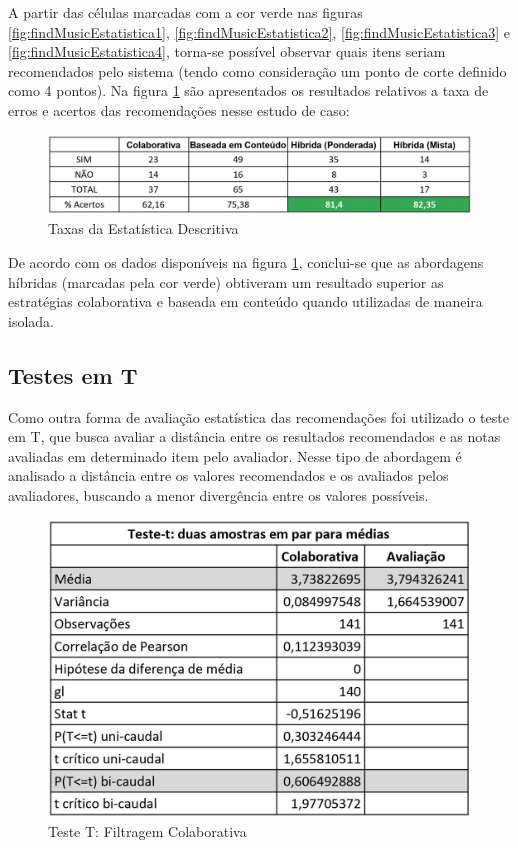 A partir das células marcadas com a cor verde nas figuras \ref{fig:findMusicEstatistica1}, \ref{fig:findMusicEstatistica2}, \ref{fig:findMusicEstatistica3} e \ref{fig:findMusicEstatistica4}, torna-se possível observar quais itens seriam recomendados pelo sistema (tendo como consideração um ponto de corte definido como 4 pontos). Na figura \ref{fig:findMusicEstatisticaTaxa} são apresentados os resultados relativos a taxa de erros e acertos das recomendações nesse estudo de caso:

\begin{figure}[H]
	\centering
	\includegraphics[width=.9\linewidth]{imagens/findmusicEstatisticaTaxa.jpg}
	\caption[Taxas da Estatística Descritiva]{Taxas da Estatística Descritiva}
    \label{fig:findMusicEstatisticaTaxa}
\end{figure}

De acordo com os dados disponíveis na figura \ref{fig:findMusicEstatisticaTaxa}, conclui-se que as abordagens híbridas (marcadas pela cor verde) obtiveram um resultado superior as estratégias colaborativa e baseada em conteúdo quando utilizadas de maneira isolada.

\subsection{Testes em T}

Como outra forma de avaliação estatística das recomendações foi utilizado o teste em T, que busca avaliar a distância entre os resultados recomendados e as notas avaliadas em determinado item pelo avaliador. Nesse tipo de abordagem é analisado a distância entre os valores recomendados e os avaliados pelos avaliadores, buscando a menor divergência entre os valores possíveis.

\begin{figure}[H]
	\centering
	\includegraphics[width=.6\linewidth]{imagens/findmusicTesteTColaborativa.jpg}
	\caption[Teste T: Filtragem Colaborativa]{Teste T: Filtragem Colaborativa}
    \label{fig:findMusicTesteTColaborativa}
\end{figure}

